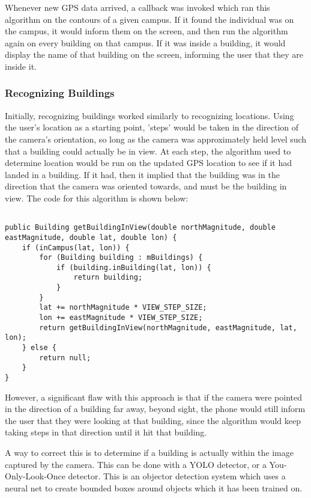 \documentclass[12pt,journal,compsoc]{IEEEtran}
\begin{document}
Whenever new GPS data arrived, a callback was invoked which ran this algorithm on the contours of a given campus. If it found the individual was on the campus, it would inform them on the screen, and then run the algorithm again on every building on that campus. If it was inside a building, it would display the name of that building on the screen, informing the user that they are inside it.

\subsubsection{Recognizing Buildings} 

Initially, recognizing buildings worked similarly to recognizing locations. Using the user's location as a starting point, 'steps' would be taken in the direction of the camera's orientation, so long as the camera was approximately held level such that a building could actually be in view. At each step, the algorithm used to determine location would be run on the updated GPS location to see if it had landed in a building. If it had, then it implied that the building was in the direction that the camera was oriented towards, and must be the building in view. The code for this algorithm is shown below:

\pagebreak

\begin{lstlisting}

public Building getBuildingInView(double northMagnitude, double 	eastMagnitude, double lat, double lon) {
    if (inCampus(lat, lon)) {
        for (Building building : mBuildings) {
            if (building.inBuilding(lat, lon)) {
                return building;
            }
        }
        lat += northMagnitude * VIEW_STEP_SIZE;
        lon += eastMagnitude * VIEW_STEP_SIZE;
        return getBuildingInView(northMagnitude, eastMagnitude, lat, lon);
    } else {
        return null;
    }
}
\end{lstlisting}

However, a significant flaw with this approach is that if the camera were pointed in the direction of a building far away, beyond sight, the phone would still inform the user that they were looking at that building, since the algorithm would keep taking steps in that direction until it hit that building.

A way to correct this is to determine if a building is actually within the image captured by the camera. This can be done with a YOLO detector, or a You-Only-Look-Once detector. This is an objector detection system which uses a neural net to create bounded boxes around objects which it has been trained on.
\end{document}
